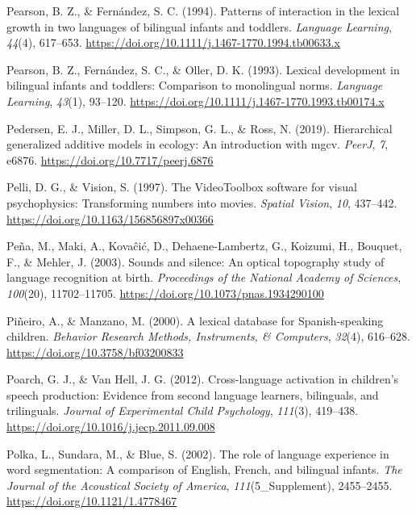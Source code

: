 \documentclass[
  12pt,
  b5paperpaper,
  twoside]{scrreprt}
\newlength{\cslhangindent}
\newlength{\cslentryspacingunit} %
\newenvironment{CSLReferences}[2] %
 {%
  \setlength{\parindent}{0pt}
  \ifodd #1
  \let\oldpar\par
  \def\par{\hangindent=\cslhangindent\oldpar}
  \fi
  \setlength{\parskip}{#2\cslentryspacingunit}
 }%
 {}
\begin{document}
\begin{CSLReferences}{1}{0}
\leavevmode{}%
Pearson, B. Z., \& Fernández, S. C. (1994). Patterns of interaction in
the lexical growth in two languages of bilingual infants and toddlers.
\emph{Language Learning}, \emph{44}(4), 617--653.
\url{https://doi.org/10.1111/j.1467-1770.1994.tb00633.x}

\leavevmode{}%
Pearson, B. Z., Fernández, S. C., \& Oller, D. K. (1993). Lexical
development in bilingual infants and toddlers: Comparison to monolingual
norms. \emph{Language Learning}, \emph{43}(1), 93--120.
\url{https://doi.org/10.1111/j.1467-1770.1993.tb00174.x}

\leavevmode{}%
Pedersen, E. J., Miller, D. L., Simpson, G. L., \& Ross, N. (2019).
Hierarchical generalized additive models in ecology: An introduction
with mgcv. \emph{PeerJ}, \emph{7}, e6876.
\url{https://doi.org/10.7717/peerj.6876}

\leavevmode{}%
Pelli, D. G., \& Vision, S. (1997). The {VideoToolbox} software for
visual psychophysics: Transforming numbers into movies. \emph{Spatial
Vision}, \emph{10}, 437--442.
\url{https://doi.org/10.1163/156856897x00366}

\leavevmode{}%
Peña, M., Maki, A., Kovaĉić, D., Dehaene-Lambertz, G., Koizumi, H.,
Bouquet, F., \& Mehler, J. (2003). Sounds and silence: An optical
topography study of language recognition at birth. \emph{Proceedings of
the National Academy of Sciences}, \emph{100}(20), 11702--11705.
\url{https://doi.org/10.1073/pnas.1934290100}

\leavevmode{}%
Piñeiro, A., \& Manzano, M. (2000). A lexical database for
{Spanish-speaking} children. \emph{Behavior Research Methods,
Instruments, \& Computers}, \emph{32}(4), 616--628.
\url{https://doi.org/10.3758/bf03200833}

\leavevmode{}%
Poarch, G. J., \& Van Hell, J. G. (2012). Cross-language activation in
children's speech production: Evidence from second language learners,
bilinguals, and trilinguals. \emph{Journal of Experimental Child
Psychology}, \emph{111}(3), 419--438.
\url{https://doi.org/10.1016/j.jecp.2011.09.008}

\leavevmode{}%
Polka, L., Sundara, M., \& Blue, S. (2002). The role of language
experience in word segmentation: A comparison of {English}, {French},
and bilingual infants. \emph{The Journal of the Acoustical Society of
America}, \emph{111}(5\_Supplement), 2455--2455.
\url{https://doi.org/10.1121/1.4778467}


\end{CSLReferences}
\end{document}
